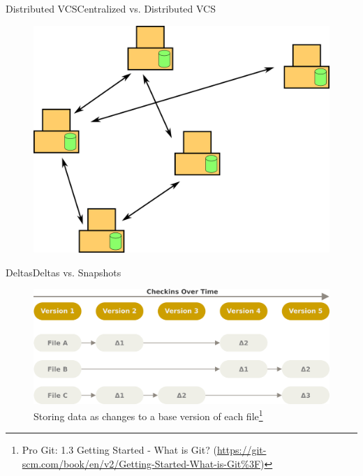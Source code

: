 \documentclass[aspectratio=169]{beamer}
\begin{document}
\begin{frame}{Distributed VCS}{Centralized vs. Distributed VCS}
\begin{figure}
    \centering
    \includegraphics[width=\textwidth,height=0.6\textheight,keepaspectratio]{02_distributed_vcs}
\end{figure}
\end{frame}

\begin{frame}{Deltas}{Deltas vs. Snapshots}
\begin{figure}
    \centering
    \includegraphics[width=\textwidth,height=0.6\textheight,keepaspectratio]{deltas}
    \caption{
        Storing data as changes to a base version of each file\footnote{
            Pro Git: 1.3 Getting Started - What is Git?
            (\url{https://git-scm.com/book/en/v2/Getting-Started-What-is-Git\%3F})
        }
    }
\end{figure}
\end{frame}
\end{document}
